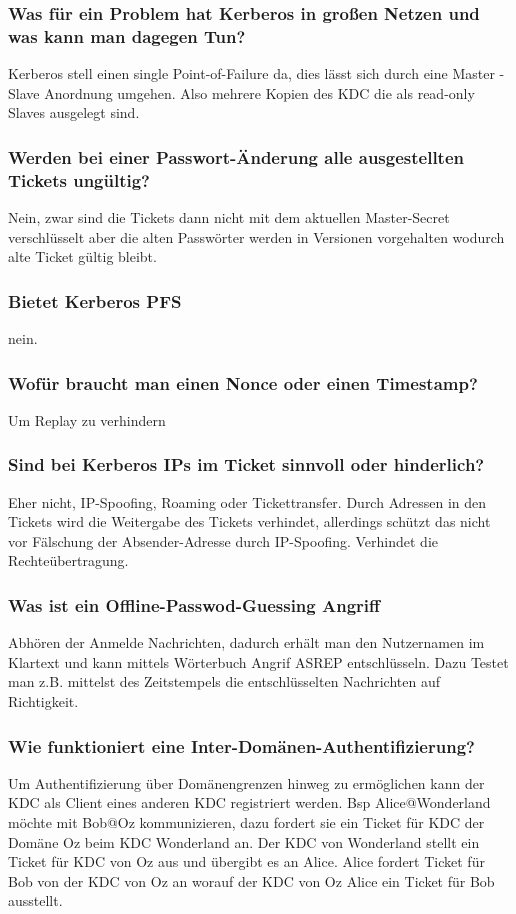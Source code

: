 	\subsubsection{Was für ein Problem hat Kerberos in großen Netzen und was kann man dagegen Tun?}
	Kerberos stell einen single Point-of-Failure da, dies lässt sich durch eine Master - Slave Anordnung umgehen. Also mehrere Kopien des KDC die als read-only Slaves ausgelegt sind.
	
	\subsubsection{Werden bei einer Passwort-Änderung alle ausgestellten Tickets ungültig?}
	Nein, zwar sind die Tickets dann nicht mit dem aktuellen Master-Secret verschlüsselt aber die alten Passwörter werden in Versionen vorgehalten wodurch alte Ticket gültig bleibt.

	\subsubsection{Bietet Kerberos PFS}
	nein.
	
	\subsubsection{Wofür braucht man einen Nonce oder einen Timestamp?}
	Um Replay zu verhindern
	
	\subsubsection{Sind bei Kerberos IPs im Ticket sinnvoll oder hinderlich?}
	Eher nicht, IP-Spoofing, Roaming oder Tickettransfer.
	Durch Adressen in den Tickets wird die Weitergabe des Tickets verhindet, allerdings schützt das nicht vor Fälschung der Absender-Adresse durch IP-Spoofing. Verhindet die Rechteübertragung.
	
	\subsubsection{Was ist ein Offline-Passwod-Guessing Angriff}
	Abhören der Anmelde Nachrichten, dadurch erhält man den Nutzernamen im Klartext und kann mittels Wörterbuch Angrif AS\textunderscore REP entschlüsseln. Dazu Testet man z.B. mittelst des Zeitstempels die entschlüsselten Nachrichten auf Richtigkeit. 
	
	\subsubsection{Wie funktioniert eine Inter-Domänen-Authentifizierung?}
	Um Authentifizierung über Domänengrenzen hinweg zu ermöglichen kann der KDC als Client eines anderen KDC registriert werden. Bsp Alice@Wonderland möchte mit Bob@Oz kommunizieren, dazu fordert sie ein Ticket für KDC der Domäne Oz beim KDC Wonderland an. Der KDC von Wonderland stellt ein Ticket für KDC von Oz aus und übergibt es an Alice. Alice fordert Ticket für Bob von der KDC von Oz an worauf der KDC von Oz Alice ein Ticket für Bob ausstellt.
	

